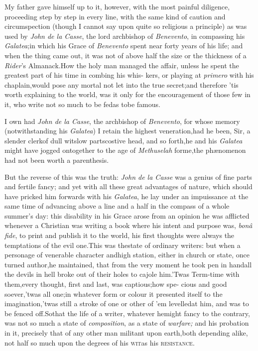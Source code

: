 \documentclass{article}
\begin{document}
My father gave himself up to it, however, with the most painful
diligence,\break
proceeding step by step in every line, with the same
kind of caution and cir\-cumspection (though I cannot say upon quite
so religious a principle) as was used by \textit{John de la Casse},
the lord archbishop of \textit{Benevento}, in compassing his
\textit{Galatea};\break in which his Grace of \textit{Benevento} spent near
forty years of his life; and when the thing came out, it was not of
above half the size or the thickness of a \textit{Rider}’s\break
Almanack.\tsk How the holy man managed the affair, unless he
spent the great\-est part of his time in combing his whis- kers, or
playing at \textit{primero} with his chaplain,\tsk would pose any
mortal not let into the true secret;\tsk and therefore ’tis
worth explaining to the world, was it only for the encouragement of
those few in it, who write not so much to be fed\tsk as to\break be
famous.

I own had \textit{John de la Casse}, the archbishop of
\textit{Benevento}, for whose memory (notwithstanding his
\textit{Galatea}) I retain the highest veneration,\tsk had he
been, Sir, a slender clerk\tsk of dull wit\tsk slow
parts\tsk costive head, and so forth,\tsk he and his
\textit{Galatea} might have jogged on\break together to the age of
\textit{Methuselah} for\break me,\tsk the phænomenon had not been
worth a parenthesis.\tsk

But the reverse of this was the truth: \textit{John de la Casse}
was a genius of fine parts and fertile fancy; and yet with all
these great advantages of nature, which should have pricked him
forwards with his \textit{Ga\-latea}, he lay under an impuissance at
the same time of advancing above a line and a half in the compass
of a whole summer’s day: this disability in his Grace arose
from an opinion he was afflicted  whenever a Christian was writing a
book  where his intent and
purpose was, \textit{bonâ fide}, to print and publish it to the
world, his first thoughts were always the temptations of the evil
one.\tsk This was the\break state of ordinary writers: but when a
personage of venerable character and\break high station, either in church
or state, once turned author,\tsk he maintained, that from the
very moment he took pen in hand\tsk all the devils in hell broke
out of their holes to cajole him.\tsk ’Twas Term-time with
them,\tsk every thought, first and last, was captious;\tsk how spe-
cious and good soever,\tsk ’twas all one;\break\tsk in whatever form or
colour it present\-ed itself to the imagination,\tsk ’twas still\break 
a stroke of one or other of ’em levelled\break at him,
and was to be fenced off.\tsk So\break that the life of a writer,
whatever he\break might fancy to the contrary, was not so much a state of
\textit{composition}, as a state of \textit{warfare;} and his probation
in it, precisely that of any other man militant upon\break
earth,\tsk both depending alike, not half so much upon the
degrees of his \textsc{wit}\tsk\break as his \textsc{resistance}.
\end{document}
